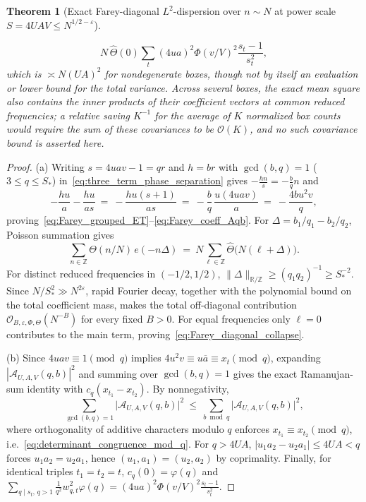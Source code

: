 \documentclass[11pt, a4paper]{article}
\theoremstyle{plain}
\newtheorem{theorem}{Theorem}[section]
\theoremstyle{definition}
\newcommand{\Z}{\mathbb{Z}}
\newcommand{\R}{\mathbb{R}}
\begin{document}
\begin{theorem}[Exact Farey-diagonal $L^{2}$-dispersion over $n\sim N$ at power scale $S=\allowbreak 4UAV\le\allowbreak N^{1/2-\varepsilon}$]
\begin{enumerate}[(a)]
    \[
    N\,\widehat{\Theta}(0)\sum_{t}(4ua)^{2}\Phi(v/V)^{2}\frac{s_t-1}{s_t^{2}},
    \]
    which is $\asymp N(UA)^{2}$ for nondegenerate boxes, though not by itself an evaluation or lower bound for the total variance. Across several boxes, the exact mean square also contains the inner products of their coefficient vectors at common reduced frequencies; a relative saving $K^{-1}$ for the average of $K$ normalized box counts would require the sum of these covariances to be $\mathcal{O}(K)$, and no such covariance bound is asserted here.
\end{enumerate}
\end{theorem}
\begin{proof}
(a) Writing $s=4uav-1=qr$ and $h=br$ with $\gcd(b,q)=1$ ($3\le q\le S_{\ast}$) in~\eqref{eq:three_term_phase_separation} gives $-\frac{hn}{s}=-\frac{b}{q}n$ and
\[
-\frac{hu}{a}-\frac{hu}{as}\ =\ -\frac{hu(s+1)}{as}\ =\ -\frac{b}{q}\,\frac{u(4uav)}{a}\ =\ -\frac{4bu^{2}v}{q},
\]
proving~\eqref{eq:Farey_grouped_ET}--\eqref{eq:Farey_coeff_Aqb}. For $\Delta=b_1/q_1-b_2/q_2$, Poisson summation gives
\[
\sum_{n\in\Z}\Theta(n/N)\,e(-n\Delta)\ =\ N\sum_{\ell\in\Z}\widehat{\Theta}\big(N(\ell+\Delta)\big).
\]
For distinct reduced frequencies in $(-1/2,1/2)$, $\|\Delta\|_{\R/\Z}\ge(q_1q_2)^{-1}\ge S_{\ast}^{-2}$. Since $N/S_{\ast}^{2}\gg N^{2\varepsilon}$, rapid Fourier decay, together with the polynomial bound on the total coefficient mass, makes the total off-diagonal contribution $\mathcal{O}_{B,\varepsilon,\Phi,\Theta}(N^{-B})$ for every fixed $B>0$. For equal frequencies only $\ell=0$ contributes to the main term, proving~\eqref{eq:Farey_diagonal_collapse}.

(b) Since $4uav\equiv1\pmod q$ implies $4u^{2}v\equiv u\overline{a}\equiv x_t\pmod q$, expanding $|\mathcal{A}_{U,A,V}(q,b)|^{2}$ and summing over $\gcd(b,q)=1$ gives the exact Ramanujan-sum identity with $c_q(x_{t_1}-x_{t_2})$. By nonnegativity,
\[
\sum_{\gcd(b,q)=1}\big|\mathcal{A}_{U,A,V}(q,b)\big|^{2}\ \le\ \sum_{b\bmod q}\big|\mathcal{A}_{U,A,V}(q,b)\big|^{2},
\]
where orthogonality of additive characters modulo $q$ enforces $x_{t_1}\equiv x_{t_2}\pmod q$, i.e.~\eqref{eq:determinant_congruence_mod_q}. For $q>4UA$, $|u_1a_2-u_2a_1|\le 4UA<q$ forces $u_1a_2=u_2a_1$, hence $(u_1,a_1)=(u_2,a_2)$ by coprimality. Finally, for identical triples $t_1=t_2=t$, $c_q(0)=\varphi(q)$ and $\sum_{q\mid s_t,\,q>1}\frac{1}{q^{2}}w_{q,t}^{2}\varphi(q)=(4ua)^{2}\Phi(v/V)^{2}\frac{s_t-1}{s_t^{2}}$.
\end{proof}
\end{document}
